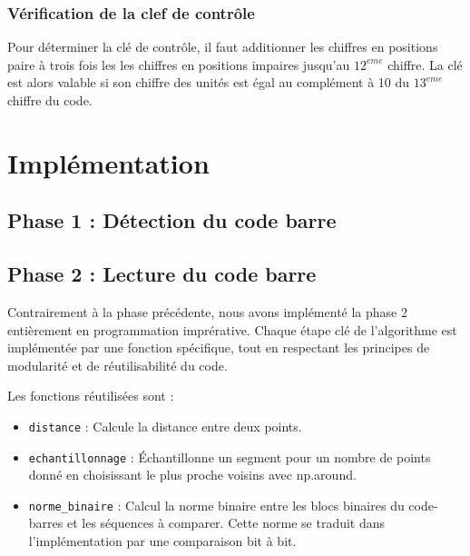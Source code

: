 \documentclass{rapport}
\begin{document}
\subsubsection*{Vérification de la clef de contrôle}
Pour déterminer la clé de contrôle, il faut additionner les chiffres en positions paire à trois fois les
les chiffres en positions impaires jusqu'au $12^{eme}$ chiffre. La clé est alors valable si son chiffre des
unités est égal au complément à 10 du $13^{eme}$ chiffre du code.
 
\section{Implémentation}

\subsection{Phase 1 : Détection du code barre}

\subsection{Phase 2 : Lecture du code barre}

Contrairement à la phase précédente, nous avons implémenté la phase 2 entièrement en programmation imprérative.
Chaque étape clé de l'algorithme est implémentée par une fonction spécifique, tout en respectant les principes de modularité et de réutilisabilité du code.

Les fonctions réutilisées sont : 
\begin{itemize}
	\item \texttt{distance} : Calcule la distance entre deux points.
	\item \texttt{echantillonnage} : Échantillonne un segment pour un nombre de points donné en choisissant le plus proche voisins avec np.around.
	\item \texttt{norme\_binaire} : Calcul la norme binaire entre les blocs binaires du code-barres et les séquences à comparer. Cette norme se traduit dans l'implémentation par une comparaison bit à bit.
\end{itemize}
\end{document}
